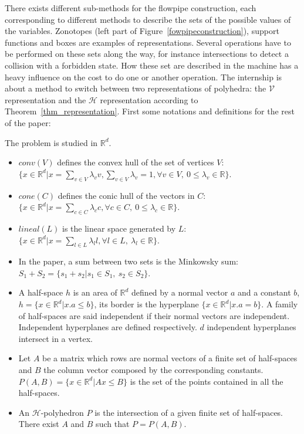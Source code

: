 There exists different sub-methods for the flowpipe construction, each corresponding to different methods to describe the sets of the possible values of the variables. Zonotopes (left part of Figure~\ref{fowpipeconstruction}), support functions and boxes are examples of representations. Several operations have to be performed on these sets along the way, for instance intersections to detect a collision with a forbidden state. How these set are described in the machine has a heavy influence on the cost to do one or another operation. The internship is about a method to switch between two representations of polyhedra: the $\mathcal{V}$ representation and the $\mathcal{H}$ representation according to Theorem~\ref{thm_representation}. First some notations and definitions for the rest of the paper:
 
\begin{definition}
	The problem is studied in $\mathbb{R}^d$.
	\begin{itemize}
	\item $conv(V)$ defines the convex hull of the set of vertices $V$: $\{ x\in\mathbb{R}^d| x=\sum_{v\in V} \lambda_v v, \sum_{v\in V} \lambda_v =1, \forall v \in V, \ 0\leq \lambda_v \in \mathbb{R} \}$.
	\item $cone(C)$ defines the conic hull of the vectors in $C$: $\{ x\in\mathbb{R}^d| x=\sum_{c\in C} \lambda_c c, \forall c \in C,\ 0\leq \lambda_c \in \mathbb{R} \}$.
	\item $lineal(L)$ is the linear space generated by $L$: $\{ x\in\mathbb{R}^d| x=\sum_{l\in L} \lambda_l l, \forall l \in L,\ \lambda_l \in \mathbb{R} \}$. 
	\item In the paper, a sum between two sets is the Minkowsky sum: $S_1+S_2=\{s_1+s_2|s_1\in S_1,\ s_2 \in S_2 \}$.
	\item A half-space $h$ is an area of $\mathbb{R}^d$ defined by a normal vector $a$ and a constant $b$, $h=\{x\in\mathbb{R}^d|x.a\leq b\}$, its border is the hyperplane $\{x\in\mathbb{R}^d|x.a = b\}$. A family of half-spaces are said independent if their normal vectors are independent. Independent hyperplanes are defined respectively. $d$ independent hyperplanes intersect in a vertex.
	\item Let $A$ be a matrix which rows are normal vectors of a finite set of half-spaces and $B$ the column vector composed by the corresponding constants. $P(A,B)=\{x\in\mathbb{R}^d|Ax\leq B\}$ is the set of the points contained in all the half-spaces.
	\item An $\mathcal{H}$-polyhedron $P$ is the intersection of a given finite set of half-spaces. There exist $A$ and $B$ such that $P=P(A,B)$.

\end{itemize}
\end{definition}
